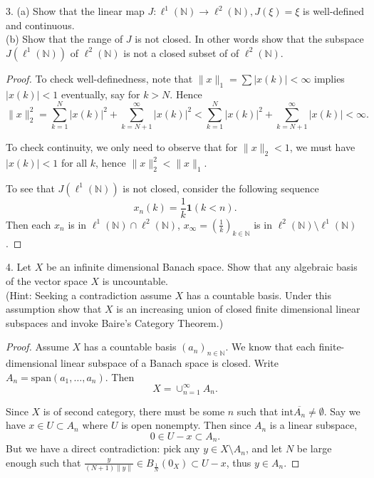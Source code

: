 \newpage
\begin{problem}
	3. (a) Show that the linear map $J: \ell^1(\mathbb{N}) \rightarrow \ell^2(\mathbb{N}), J(\xi)=\xi$ is well-defined and continuous.\\
(b) Show that the range of $J$ is not closed. In other words show that the subspace $J\left(\ell^1(\mathbb{N})\right)$ of $\ell^2(\mathbb{N})$ is not a closed subset of of $\ell^2(\mathbb{N})$.
\end{problem}
\begin{proof}
	To check well-definedness, note that $\|x\|_1 = \sum |x(k)| < \infty $ implies $|x(k)| < 1$ eventually, say for $k > N$. Hence
	\[
		\|x\|_2^2 = \sum_{k = 1}^N |x(k)|^2 + \sum_{k = N+1}^\infty |x(k)|^2 < \sum_{k = 1}^N |x(k)|^2 + \sum_{k = N+1}^\infty |x(k)| <\infty 
	.\] 

	To check continuity, we only need to observe that for $\|x\|_2 < 1$, we must have $|x(k)| < 1$  for all $k$, hence $\|x\|_2^2 < \|x\|_1$.

	To see that $J\left( \ell^1(\mathbb{N}) \right) $ is not closed, consider the following sequence
	\[
		x_n(k) = \frac{1}{k} \mathbf{1}(k < n)
	.\] 
	Then each $x_n$ is in $\ell^1(\mathbb{N}) \cap \ell^2(\mathbb{N})$, $x_\infty = \left( \frac{1}{k} \right) _{k \in \mathbb{N}}$ is in $\ell^2(\mathbb{N}) \setminus \ell^1(\mathbb{N})$.
\end{proof}

\newpage
\begin{problem}
	4. Let $X$ be an infinite dimensional Banach space. Show that any algebraic basis of the vector space $X$ is uncountable.\\
(Hint: Seeking a contradiction assume $X$ has a countable basis. Under this assumption show that $X$ is an increasing union of closed finite dimensional linear subspaces and invoke Baire's Category Theorem.)
\end{problem}
\begin{proof}
	Assume $X$ has a countable basis $(a_n)_{n \in \mathbb{N}}$. We know that each finite-dimensional linear subspace of a Banach space is closed. Write $A_n = \text{span}(a_1, \ldots, a_n)$. Then
	\[
		X = \cup_{n = 1}^\infty  A_n
	.\] 

	Since $X$ is of second category, there must be some $n$ such that $\text{int} \overline{A_n} \neq \emptyset $. Say we have $x \in U \subset A_n$ where $U$ is open nonempty. Then since $A_n$ is a linear subspace,
	\[
		0 \in U - x \subset A_n
	.\] 
	But we have a direct contradiction: pick any $y \in X \setminus A_n$, and let $N$ be large enough such that $\frac{y}{(N + 1) \|y\|} \in B_{\frac{1}{N}}(0_X)\subset U - x$, thus $y \in A_n$.
\end{proof}

